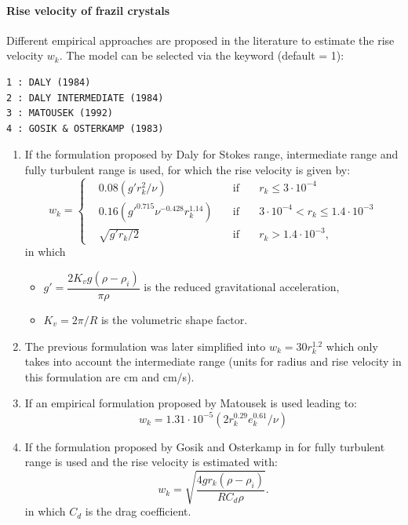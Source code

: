 \paragraph{Rise velocity of frazil crystals}
\label{buoyancy}
Different empirical approaches are proposed in the literature to estimate the rise velocity $w_k$.
The model can be selected via the keyword  (default = 1):
\begin{lstlisting}
1 : DALY (1984)
2 : DALY INTERMEDIATE (1984)
3 : MATOUSEK (1992)
4 : GOSIK & OSTERKAMP (1983)
\end{lstlisting}

\begin{enumerate}
\item If  the formulation proposed by Daly
\cite{daly_1984} for Stokes range,
intermediate range and fully turbulent range is used,
for which the rise velocity is given by:
\begin{equation}
w_k =
\left\lbrace
	\begin{matrix}
	& 0.08 ( g' r_k^2 / \nu ) \quad & \text{if} & \quad r_k \leq 3\cdot10^{-4} \\
  & 0.16 ( g'^{0.715} \nu^{-0.428} r_{k}^{1.14} ) \quad & \text{if} & \quad 3\cdot10^{-4} < r_k \leq 1.4\cdot10^{-3} \\
	& \sqrt{g' r_k/2} \quad & \text{if} & \quad r_k > 1.4 \cdot10^{-3},
\end{matrix}
\right.
\label{eq:model:rise_velocity_daly}
\end{equation}
in which
\begin{itemize}
    \item $g'= \dfrac{2 K_v g (\rho-\rho_i)}{\pi \rho}$ is the reduced gravitational acceleration,
	\item $K_v = 2 \pi /R$ is the volumetric shape factor.
\end{itemize}
\item The previous formulation was later simplified into $w_k=30r_k^{1.2}$ which only
takes into account the intermediate range (units for radius and rise velocity in this formulation
are cm and cm/s).

\item If  an empirical formulation proposed by
Matousek \cite{matouvsek1992frazil} is used leading to:
\begin{equation}
w_k=1.31\cdot10^{-5}( 2 r_k^{0.29} e_k^{0.61} / \nu )
\end{equation}

\item If  the formulation proposed by
Gosik and Osterkamp in \cite{gosink1983measurements} for fully turbulent range
is used and the rise velocity is estimated with:
\begin{equation}
w_k=\sqrt{\frac{4gr_k(\rho-\rho_i)}{R C_d \rho}}.
\label{eq:rise_velocity}
\end{equation}
in which $C_d$ is the drag coefficient.
\end{enumerate}

